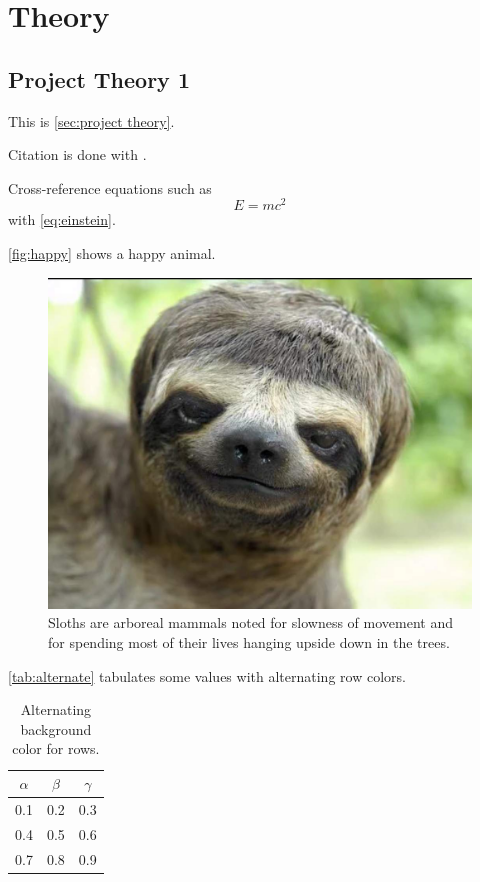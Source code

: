 \section{Theory}\label{sec:Theory}

\subsection{Project Theory 1}\label{sec:project theory}
This is \autoref{sec:project theory}.

Citation is done with  \cite[p.~100]{Sakurai}.

Cross-reference equations such as
\begin{equation}\label{eq:einstein}
    E = m c^2
\end{equation}
with \cref{eq:einstein}.

\autoref{fig:happy} shows a happy animal. 
\begin{figure}[H]
\begin{center}\includegraphics[scale=0.5]{Figures/Funny-Animal-Face.jpg}
\end{center}
\caption{Sloths are arboreal mammals noted for slowness of movement and for spending most of their lives hanging upside down in the trees.}
\label{fig:happy}
\end{figure}

\autoref{tab:alternate} tabulates some values with alternating row colors.
\begin{table}[H]
\caption{Alternating background color for rows.}
\centering
{}
\begin{tabular}{ccc}
\hline
\hline 
$\alpha$ & $\beta$ & $\gamma$
\\
\hline 
\hline 
0.1 & 0.2 & 0.3
\\
0.4 & 0.5 & 0.6
\\
0.7 & 0.8 & 0.9
\\
\hline
\end{tabular}
\label{tab:alternate}
\end{table}
